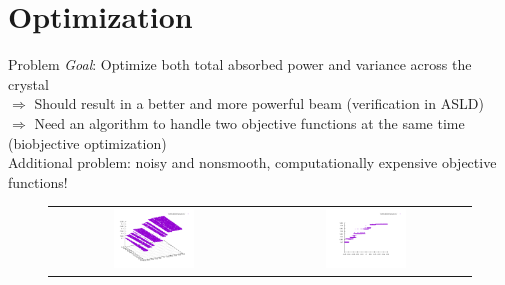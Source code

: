 \documentclass[aspectratio=43,t]{beamer}
\begin{document}
	\section{Optimization}

	\begin{frame}[fragile]{Problem}
		\emph{Goal}: Optimize both total absorbed power and variance across the crystal\\
		\bigskip
		$\Rightarrow$ Should result in a better and more powerful beam (verification in ASLD)\\
		\bigskip
		$\Rightarrow$ Need an algorithm to handle two objective functions at the same time (biobjective optimization)\\
		\bigskip
		Additional problem: noisy and nonsmooth, computationally expensive objective functions!
	
	\begin{figure}
        \centering
        \begin{tabular}{c c}
        \includegraphics[width=0.4\textwidth]{images/discontinuity.pdf} &
        \includegraphics[width=0.4\textwidth]{images/noisyness.pdf}
        \end{tabular}
    \end{figure}

	\end{frame}
\end{document}
